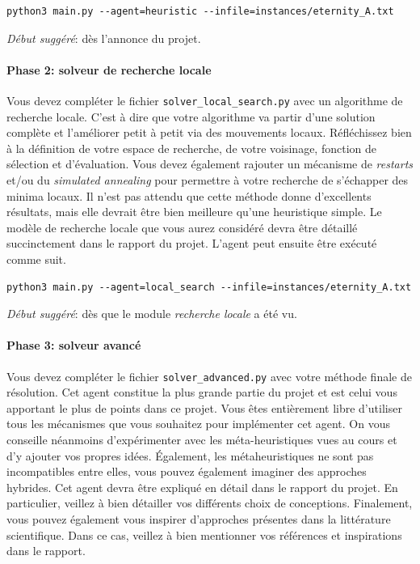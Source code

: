 \documentclass[a4paper,11pt,final,fleqn]{article}
\begin{document}
\begin{lstlisting}
python3 main.py --agent=heuristic --infile=instances/eternity_A.txt 
\end{lstlisting}

\textit{Début suggéré}: dès l'annonce du projet.

 
\paragraph{Phase 2: solveur de recherche locale} Vous devez compléter le fichier \texttt{solver\_local\_search.py} avec un algorithme de recherche locale. C'est à dire que votre algorithme va partir d'une solution complète et l'améliorer petit à petit via des mouvements locaux. 
Réfléchissez bien à la définition de votre espace de recherche, de votre voisinage, fonction de sélection et d'évaluation.
Vous devez également rajouter un mécanisme de \textit{restarts} et/ou du \textit{simulated annealing} pour permettre à votre recherche de s'échapper des minima locaux.  Il n'est pas attendu que cette méthode donne d'excellents résultats, mais elle devrait être bien meilleure qu'une 
heuristique simple. Le modèle de recherche locale que vous aurez considéré devra être détaillé succinctement dans le rapport du projet.
L'agent peut ensuite être exécuté comme suit.

\begin{lstlisting}
python3 main.py --agent=local_search --infile=instances/eternity_A.txt 
\end{lstlisting}

\textit{Début suggéré}: dès que le module \textit{recherche locale} a été vu.


\paragraph{Phase 3: solveur avancé}  Vous devez compléter le fichier \texttt{solver\_advanced.py} avec votre méthode finale de résolution. 
Cet agent constitue la plus grande partie du projet et est celui vous apportant le plus de points dans ce projet. Vous êtes entièrement libre d'utiliser tous les mécanismes que vous souhaitez pour implémenter cet agent. On vous conseille néanmoins d'expérimenter avec les méta-heuristiques vues au cours et d'y ajouter vos propres idées.  Également, les métaheuristiques ne sont pas incompatibles entre elles, vous pouvez également imaginer des approches hybrides. 
Cet agent devra être expliqué en détail dans le rapport du projet. En particulier, veillez à bien détailler vos différents choix de conceptions.
Finalement, vous pouvez également vous inspirer d'approches présentes dans la littérature scientifique. Dans ce cas, veillez à bien mentionner vos références et inspirations dans le rapport.
\end{document}
